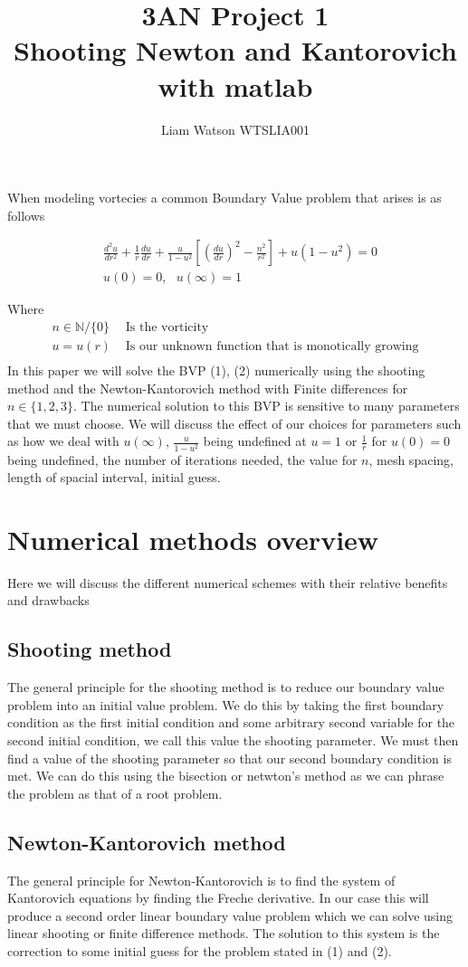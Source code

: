 \documentclass{article}
\title{3AN Project 1\\ Shooting Newton and Kantorovich with matlab}
\author{Liam Watson WTSLIA001}
\begin{document}
\maketitle
When modeling vortecies a common Boundary Value problem that arises is as follows


\begin{align}
&\frac{d^2 u}{dr^2} + \frac{1}{r}\frac{du}{dr} + \frac{u}{1-u^2}\left[\left(\frac{du}{dr}\right)^2 - \frac{n^2}{r^2}\right] + u(1-u^2) = 0 \\
&u(0) = 0,\ \ \  u(\infty) = 1
\end{align}

Where 
\begin{align*}
n\in \mathbb{N}/\{0\}&  \text{\ \ \ \ \ Is the vorticity} \\
u = u(r)& \text{ \ \ \ \ Is our unknown function that is monotically growing}\\ 
\end{align*}
In this paper we will solve the BVP (1), (2) numerically using the shooting method and the Newton-Kantorovich method with Finite differences for $n\in \{1,2,3\}$. The numerical solution to this BVP is sensitive to many parameters that we must choose. We will discuss the effect of our choices for parameters such as how we deal with $u(\infty)$, $\frac{u}{1-u^2}$ being undefined at $u = 1$ or $\frac{1}{r}$ for $u(0) = 0$ being undefined, the number of iterations needed, the value for $n$, mesh spacing, length of spacial interval, initial guess.

\section{Numerical methods overview}
Here we will discuss the different numerical schemes with their relative benefits and drawbacks 
\subsection{Shooting method}
The general principle for the shooting method is to reduce our boundary value problem into an initial value problem. We do this by taking the first boundary condition as the first initial condition and some arbitrary second variable for the second initial condition, we call this value the shooting parameter. We must then find a value of the shooting parameter so that our second boundary condition is met. We can do this using the bisection or netwton's method as we can phrase the problem as that of a root problem.     
\subsection{Newton-Kantorovich method}
The general principle for Newton-Kantorovich is to find the system of Kantorovich equations by finding the Freche derivative. In our case this will produce a second order linear boundary value problem which we can solve using linear shooting or finite difference methods. The solution to this system is the correction to some initial guess for the problem stated in (1) and (2).  
\end{document}
